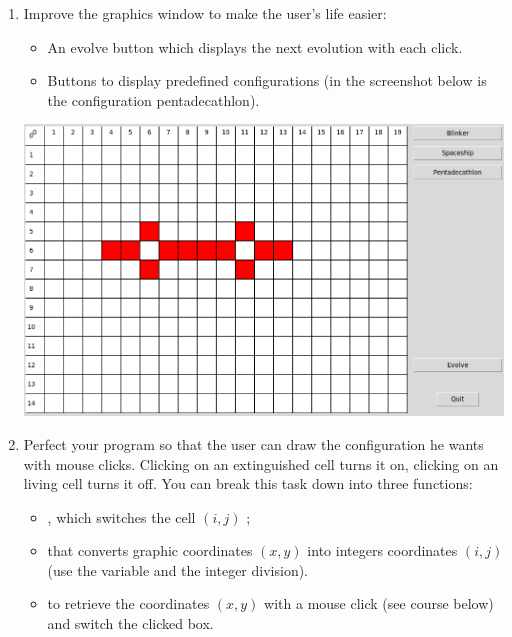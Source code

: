 \documentclass[11pt,class=report,crop=false]{standalone}
\begin{document}
 


\begin{activite}[Iterations]


\begin{enumerate}
  \item Improve the graphics window to make the user's life easier:
  \begin{itemize}
    \item An \og{}evolve\fg{} button which displays the next evolution with each click.
    \item Buttons to display predefined configurations (in the screenshot below is the configuration \og{}pentadecathlon\fg{}).
  \end{itemize}
  
\begin{center}
\includegraphics[scale=\myscale,scale=0.3]{screen-life-4a-en}
\end{center}  
  
  \item Perfect your program so that the user can draw the configuration he wants with mouse clicks. Clicking on an extinguished cell turns it on, clicking on an living cell turns it off. 
  You can break this task down into three functions:
  \begin{itemize}
    \item {}, which switches the cell $(i,j)$ ;
    \item {} that converts graphic coordinates $(x,y)$ into integers coordinates $(i,j)$ (use the   variable and the integer division).
    \item {} to retrieve the coordinates $(x,y)$ with a mouse click (see course below) and switch the clicked box.
  \end{itemize}   
    

\end{enumerate}
\end{activite}
\end{document}
